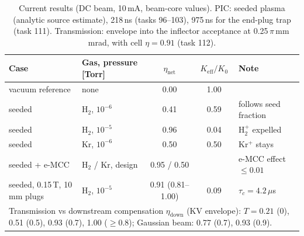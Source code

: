 \documentclass[11pt,a4paper]{article}
\newcommand{\new}[1]{\textcolor{blue!60!black}{#1}}
\begin{document}
\begin{table}[h!]
\centering
\caption{\new{Current results (DC beam, 10\,mA, beam-core values). PIC: seeded plasma (analytic source
estimate), 218\,ns (tasks 96--103), 975\,ns for the end-plug trap (task 111). Transmission: envelope
into the inflector acceptance at 0.25\,$\pi$\,mm\,mrad, with cell $\eta = 0.91$ (task 112).}}
\label{tab:results_current}
\small
\setlength{\tabcolsep}{4pt}
\begin{tabular}{llccp{}}
\toprule
Case & Gas, pressure [Torr] & $\eta_{\text{net}}$ & $K_{\text{eff}}/K_0$ & Note \\
\midrule
vacuum reference & none & 0.00 & 1.00 & \\
seeded & $\text{H}_2$, $10^{-6}$ & 0.41 & 0.59 & follows seed fraction \\
seeded & $\text{H}_2$, $10^{-5}$ & 0.96 & 0.04 & $\text{H}_2^+$ expelled \\
seeded & Kr, $10^{-6}$ & 0.50 & 0.50 & Kr$^+$ stays \\
seeded + e-MCC & $\text{H}_2$ / Kr, design & 0.95 / 0.50 & & e-MCC effect $\le 0.01$ \\
seeded, 0.15\,T, 10\,mm plugs & $\text{H}_2$, $10^{-5}$ & 0.91 (0.81--1.00) & 0.09 & $\tau_c = 4.2\,\mu$s \\
\midrule
\multicolumn{5}{p{0.95\textwidth}}{Transmission vs downstream compensation $\eta_{\text{down}}$ (KV envelope):
$T = 0.21$ (0), 0.51 (0.5), 0.93 (0.7), 1.00 ($\ge 0.8$); Gaussian beam: 0.77 (0.7), 0.93 (0.9).} \\
\bottomrule
\end{tabular}
\end{table}
\end{document}
